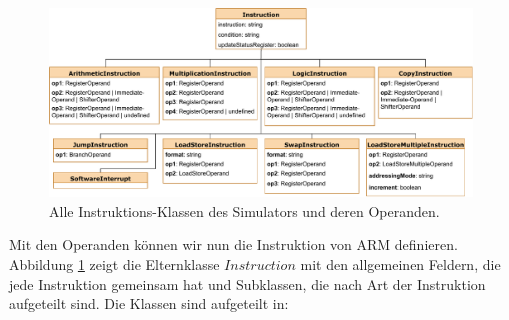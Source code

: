 \documentclass[a4paper, 11pt, onecolumn]{article}
\begin{document}
\begin{figure}[!htb]
\centering
\includegraphics[width=1\textwidth]{data/instructions}
\caption{Alle Instruktions-Klassen des Simulators und deren Operanden.}
\label{fig:instructions}
\end{figure}

Mit den Operanden können wir nun die Instruktion von ARM definieren. Abbildung \ref{fig:instructions} zeigt die Elternklasse $Instruction$ mit den allgemeinen Feldern, die jede Instruktion gemeinsam hat und Subklassen, die nach Art der Instruktion aufgeteilt sind. Die Klassen sind aufgeteilt in:
\end{document}
